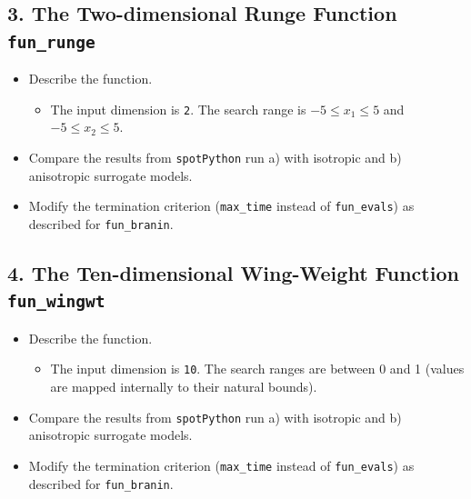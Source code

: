 \documentclass[
  letterpaper,
  DIV=11,
  numbers=noendperiod]{scrreprt}
\providecommand{\tightlist}{%
  \setlength{\itemsep}{0pt}\setlength{\parskip}{0pt}}\usepackage{longtable,booktabs,array}
\begin{document}
\subsection{\texorpdfstring{3. The Two-dimensional Runge Function
\texttt{fun\_runge}}{3. The Two-dimensional Runge Function fun\_runge}}\label{the-two-dimensional-runge-function-fun_runge}

\begin{itemize}
\tightlist
\item
  Describe the function.

  \begin{itemize}
  \tightlist
  \item
    The input dimension is \texttt{2}. The search range is
    \(-5 \leq x_1 \leq 5\) and \(-5 \leq x_2 \leq 5\).
  \end{itemize}
\item
  Compare the results from \texttt{spotPython} run a) with isotropic and
  b) anisotropic surrogate models.
\item
  Modify the termination criterion (\texttt{max\_time} instead of
  \texttt{fun\_evals}) as described for \texttt{fun\_branin}.
\end{itemize}

\subsection{\texorpdfstring{4. The Ten-dimensional Wing-Weight Function
\texttt{fun\_wingwt}}{4. The Ten-dimensional Wing-Weight Function fun\_wingwt}}\label{the-ten-dimensional-wing-weight-function-fun_wingwt}

\begin{itemize}
\tightlist
\item
  Describe the function.

  \begin{itemize}
  \tightlist
  \item
    The input dimension is \texttt{10}. The search ranges are between 0
    and 1 (values are mapped internally to their natural bounds).
  \end{itemize}
\item
  Compare the results from \texttt{spotPython} run a) with isotropic and
  b) anisotropic surrogate models.
\item
  Modify the termination criterion (\texttt{max\_time} instead of
  \texttt{fun\_evals}) as described for \texttt{fun\_branin}.
\end{itemize}
\end{document}
